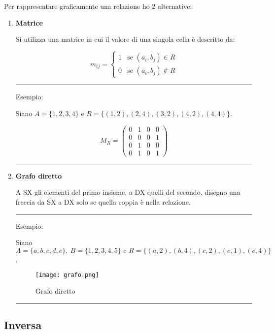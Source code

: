 \documentclass{article}
\begin{document}
Per rappresentare graficamente una relazione ho 2 alternative:
\begin{enumerate}
    \item \textbf{Matrice}

    Si utilizza una matrice in cui il valore di una singola cella è descritto da:
    
\[
m_{ij} =
\begin{cases}
1 & \text{se } (a_i, b_j) \in R \\
0 & \text{se } (a_i, b_j) \notin R
\end{cases}
\]

\noindent\rule{\textwidth}{0.5pt}

Esempio:\newline

 Siano $A = \{1, 2, 3, 4\} \text{ e } R = \{(1, 2),(2, 4),(3, 2),(4, 2),(4, 4)\}$.

 $$ M_R = \begin{pmatrix}

    0 & 1 & 0 & 0\\
    0 & 0 & 0 & 1\\
    0 & 1 & 0 & 0\\
    0 & 1 & 0 & 1
     
 \end{pmatrix}$$

\noindent\rule{\textwidth}{0.5pt}

\item \textbf{Grafo diretto}

    A SX gli elementi del primo insieme, a DX quelli del secondo,
    disegno una freccia da SX a DX solo se quella coppia è nella relazione.

\noindent\rule{\textwidth}{0.5pt}

Esempio:\newline

 Siano $ A = \{a,b,c,d,e\}, \ B = \{1,2,3,4,5\} \text{ e } R=\{(a, 2),(b, 4),(c, 2),(e, 1),(e, 4)\}$.

    \begin{figure}[ht]
        \centering
        \texttt{[image: grafo.png]}
        \caption{Grafo diretto}
        \label{fig:grafo}
    \end{figure}

\noindent\rule{\textwidth}{0.5pt}
    
\end{enumerate}

\subsection{Inversa}
\end{document}
